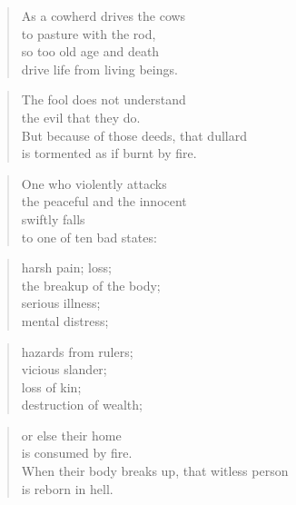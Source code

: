 \documentclass[12pt,openany]{book}%
\begin{document}
\begin{verse}%
As a cowherd drives the cows \\
to pasture with the rod, \\
so too old age and death \\
drive life from living beings. 

%
\end{verse}

\begin{verse}%
The fool does not understand \\
the evil that they do. \\
But because of those deeds, that dullard \\
is tormented as if burnt by fire. 

%
\end{verse}

\begin{verse}%
One who violently attacks \\
the peaceful and the innocent \\
swiftly falls \\
to one of ten bad states: 

%
\end{verse}

\begin{verse}%
harsh pain; loss; \\
the breakup of the body; \\
serious illness; \\
mental distress; 

%
\end{verse}

\begin{verse}%
hazards from rulers; \\
vicious slander; \\
loss of kin; \\
destruction of wealth; 

%
\end{verse}

\begin{verse}%
or else their home \\
is consumed by fire. \\
When their body breaks up, that witless person \\
is reborn in hell. 

%
\end{verse}
\end{document}

